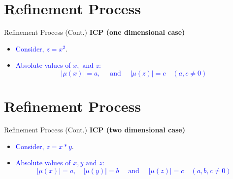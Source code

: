 \documentclass[]{beamer}
\begin{document}
\section{Refinement Process}
\begin{frame}{Refinement Process (Cont.)}
    \textbf{ICP (one dimensional case)}
    \bigskip
    \bigskip
   \begin{itemize}
   \item \textcolor<1>{blue}{Consider, $z = x^2$}.
   \item \textcolor<2>{blue}{Absolute values of $x, \text{ and } z$:
    $$|\mu(x)| = a, \quad  \text{ and } \quad |\mu(z)| = c \quad (a, c \neq 0)$$}
\end{itemize}
\end{frame}

\section{Refinement Process}
\begin{frame}{Refinement Process (Cont.)}
    \textbf{ICP (two dimensional case)}
    \bigskip
    \bigskip
   \begin{itemize}
   \item \textcolor<1>{blue}{Consider, $z = x*y$}.
   \item \textcolor<2>{blue}{Absolute values of $x, y \text{ and } z$:
    $$|\mu(x)| = a, \quad  |\mu(y)| = b \quad \text{ and } \quad |\mu(z)| = c \quad (a, b, c \neq 0)$$}
\end{itemize}
\end{frame}
\end{document}
